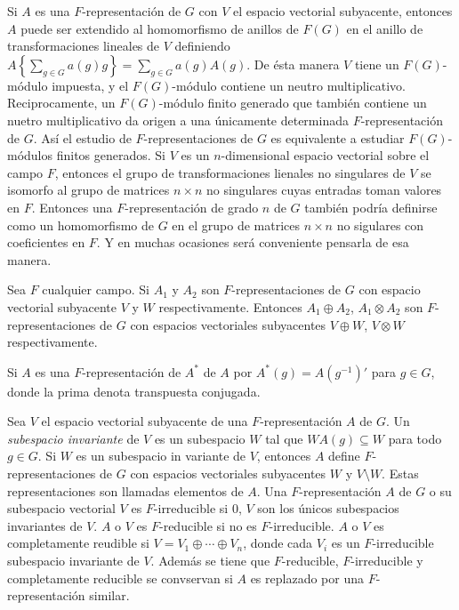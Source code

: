 \documentclass[12pt]{book}
\theoremstyle{definition}
\newcounter{in}
\newcounter{ini}
\newcommand{\rep}{A}
\begin{document}
Si $\rep$ es una $F$-representación de $G$ con $V$ el espacio
vectorial subyacente, entonces $\rep$ puede ser extendido al
homomorfismo de anillos de $F(G)$ en el anillo de transformaciones
lineales de $V$ definiendo
$\rep \left\{ \sum_{g \in G} a(g)g \right\} = \sum_{g \in G}
a(g) \rep(g) $. De ésta manera $V$ tiene un $F(G)$-módulo
impuesta, y el $F(G)$-módulo contiene un neutro
multiplicativo. Reciprocamente, un $F(G)$-módulo finito generado que
también contiene un nuetro multiplicativo da origen a una únicamente
determinada $F$-representación de $G$. Así el estudio de
$F$-representaciones de $G$ es equivalente a estudiar $F(G)$-módulos
finitos generados.  Si $V$ es un $n$-dimensional espacio vectorial
sobre el campo $F$, entonces el grupo de transformaciones lienales no
singulares de $V$ se isomorfo al grupo de matrices $n \times n$ no
singulares cuyas entradas toman valores en $F$. Entonces una
$F$-representación de grado $n$ de $G$ también podría definirse como
un homomorfismo de $G$ en el grupo de matrices $n \times n$ no
sigulares con coeficientes en $F$. Y en muchas ocasiones será
conveniente pensarla de esa manera.

Sea $F$ cualquier campo. Si $\rep_{1}$ y $\rep_{2}$ son
$F$-representaciones de $G$ con espacio vectorial subyacente $V$ y $W$
respectivamente. Entonces $\rep_{1} \oplus \rep_{2}$,
$\rep_{1} \otimes \rep_{2}$ son $F$-representaciones de
$G$ con espacios vectoriales subyacentes $V \oplus W$, $V \otimes W$
respectivamente.

Si $\rep$ es una $F$-representación de $\rep^{*}$ de
$\rep$ por $\rep^{*}(g)=\rep(g^{-1})'$ para
$g \in G$, donde la prima denota transpuesta conjugada.

Sea $V$ el espacio vectorial subyacente de una $F$-representación
$\rep$ de $G$. Un \emph{subespacio invariante} de $V$ es un
subespacio $W$ tal que $W \rep(g) \subseteq W $ para todo
$g \in G$. Si $W$ es un subespacio in variante de $V$, entonces
$\rep$ define $F$-representaciones de $G$ con espacios
vectoriales subyacentes $W$ y $V \setminus W$. Estas representaciones
son llamadas elementos de $\rep$. Una $F$-representación
$\rep$ de $G$ o su subespacio vectorial $V$ es $F$-irreducible
si $0$, $V$ son los únicos subespacios invariantes de
$V$. $\rep$ o $V$ es $F$-reducible si no es
$F$-irreducible. $\rep$ o $V$ es completamente reudible si
$V = V_{1} \oplus \cdots \oplus V_{n}$, donde cada $V_{i}$ es un
$F$-irreducible subespacio invariante de $V$. Además se tiene que
$F$-reducible, $F$-irreducible y completamente reducible se convservan
si $\rep$ es replazado por una $F$-representación similar.
\end{document}
